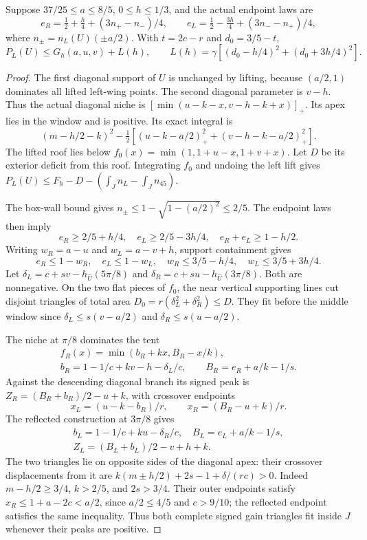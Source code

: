 \begin{lemma}\label{lem:full-three-tent-score}
Suppose $37/25\le a\le8/5$, $0\le h\le1/3$, and the actual
endpoint laws are
\[
 e_R=\tfrac12+\tfrac h4+(3n_+-n_-)/4,\qquad
 e_L=\tfrac12-\tfrac{3h}4+(3n_--n_+)/4,
\]
where $n_\pm=n_L(U)(\pm a/2)$.
With $t=2c-r$ and $d_0=3/5-t$,
\begin{equation}\label{eq:full-three-tent-score}
 P_L(U)\le G_h(a,u,v)+
 L(h),\qquad
 L(h)=\gamma[(d_0-h/4)^2+(d_0+3h/4)^2].
\end{equation}
\end{lemma}
\begin{proof}
The first diagonal support of $U$ is unchanged by lifting, because
$(a/2,1)$ dominates all lifted left-wing points. The second diagonal
parameter is $v-h$. Thus the actual diagonal niche is
$[\min(u-k-x,v-h-k+x)]_+$.
Its apex lies in the window and is positive. Its exact integral is
\[
 (m-h/2-k)^2
  -\tfrac12[(u-k-a/2)_+^2+(v-h-k-a/2)_+^2].
\]
The lifted roof lies below
$f_0(x)=\min(1,1+u-x,1+v+x)$.
Let $D$ be its exterior deficit from this roof. Integrating $f_0$
and undoing the left lift gives
$P_L(U)\le F_h-D-(\int_J n_L-\int_Jn_{45})$.

The box-wall bound gives $n_\pm\le1-\sqrt{1-(a/2)^2}\le2/5$.
The endpoint laws then imply
\[
 e_R\ge2/5+h/4,\quad e_L\ge2/5-3h/4,
 \quad e_R+e_L\ge1-h/2.
\]
Writing $w_R=a-u$ and $w_L=a-v+h$, support containment gives
\[
 e_R\le1-w_R,\quad e_L\le1-w_L,
 \quad w_R\le3/5-h/4,\quad w_L\le3/5+3h/4.
\]
Let
$\delta_L=c+sv-h_{\widehat U}(5\pi/8)$ and
$\delta_R=c+su-h_{\widehat U}(3\pi/8)$.
Both are nonnegative. On the two flat pieces of $f_0$, the near
vertical supporting lines cut disjoint triangles of total area
$D_0=r(\delta_L^2+\delta_R^2)\le D$.
They fit before the middle window since
$\delta_L\le s(v-a/2)$ and $\delta_R\le s(u-a/2)$.

The niche at $\pi/8$ dominates the tent
\[
 \begin{gathered}
 f_R(x)=\min(b_R+kx,B_R-x/k),\\
 b_R=1-1/c+kv-h-\delta_L/c,\qquad B_R=e_R+a/k-1/s.
 \end{gathered}
\]
Against the descending diagonal branch its signed peak is
$Z_R=(B_R+b_R)/2-u+k$, with crossover endpoints
\[
 x_L=(u-k-b_R)/r,\qquad x_R=(B_R-u+k)/r.
\]
The reflected construction at $3\pi/8$ gives
\[
 \begin{gathered}
 b_L=1-1/c+ku-\delta_R/c,\quad B_L=e_L+a/k-1/s,\\
 Z_L=(B_L+b_L)/2-v+h+k.
 \end{gathered}
\]
The two triangles lie on opposite sides of the diagonal apex:
their crossover displacements from it are
$k(m\pm h/2)+2s-1+\delta/(rc)>0$.
Indeed $m-h/2\ge3/4$, $k>2/5$, and $2s>3/4$.
Their outer endpoints satisfy
$x_R\le1+a-2c<a/2$, since $a/2\le4/5$ and $c>9/10$;
the reflected endpoint satisfies the same inequality.
Thus both complete signed gain triangles fit inside $J$ whenever
their peaks are positive.


\end{proof}
